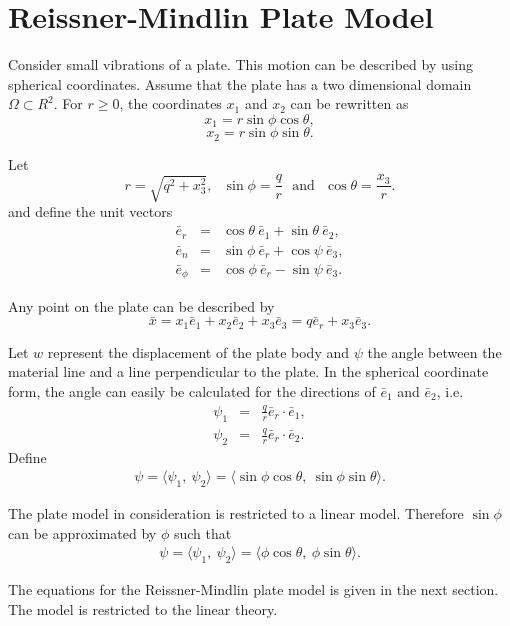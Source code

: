 \documentclass[../../main.tex]{subfiles}
\begin{document}
	\section{Reissner-Mindlin Plate Model} \label{sec:P_Model}
	Consider small vibrations of a plate. This motion can be described by using spherical coordinates. Assume that the plate has a two dimensional domain $\Omega \subset R^2$. For $r \geq 0$, the coordinates $x_1$ and $x_2$ can be rewritten as
	\[ x_1 = r \sin \phi \cos \theta, \]
	\[ x_2 = r \sin \phi \sin \theta. \]
	
	Let
	\[ r = \sqrt{q^2 + x_3^2},~~~\sin \phi = \frac{q}{r}~~~\textrm{and}~~~\cos \theta = \frac{x_3}{r}.\]
	and define the unit vectors
	\begin{eqnarray*}
		\bar e_r &=& \cos \theta ~\bar e_1 + \sin \theta ~\bar e_2,\\
		\bar e_n &=& \sin \phi~\bar e_r + \cos \psi~\bar e_3, \\
		\bar e_\phi &=& \cos \phi~\bar e_r - \sin \psi~\bar e_3.
	\end{eqnarray*}
	
	Any point on the plate can be described by
	\[ \bar{x} = x_1 \bar e_1 + x_2 \bar e_2 + x_3 \bar e_3 = q \bar e_r + x_3 \bar e_3. \] \label{sym:en}
	
	
	Let $w$ represent the displacement of the plate body and $\psi$ the angle between the material line and a line perpendicular to the plate. In the spherical coordinate form, the angle can easily be calculated for the directions of $\bar{e}_1$ and $\bar{e}_2$, i.e.
	\begin{eqnarray*}
		\psi_1 & = & \frac{q}{r} \bar{e}_r \cdot \bar{e}_1, \\
		\psi_2 & = & \frac{q}{r} \bar{e}_r \cdot \bar{e}_2.
	\end{eqnarray*}
	Define
	\begin{eqnarray*}
		{\psi} = \langle \psi_1, \ \psi_2\rangle = \langle \sin\phi \cos \theta, \ \sin\phi \sin \theta\rangle.
	\end{eqnarray*}
	
	The plate model in consideration is restricted to a linear model. Therefore $\sin\phi$ can be approximated by $\phi$ such that
	\begin{eqnarray*}
		{\psi} = \langle \psi_1, \  \psi_2\rangle = \langle \phi \cos \theta, \ \phi \sin \theta \rangle.
	\end{eqnarray*}
	
	The equations for the Reissner-Mindlin plate model is given in the next section. The model is restricted to the linear theory.
	
\end{document}
